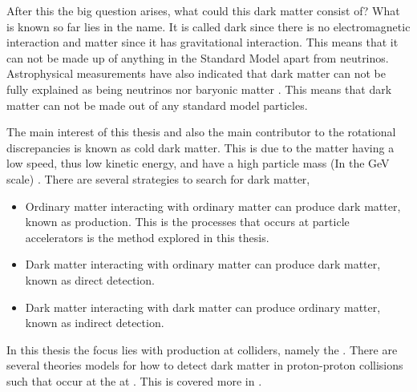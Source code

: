 After this the big question arises, what could this dark matter consist of? What is known so far lies in the name. It is called dark since there is no electromagnetic interaction and matter since it has gravitational interaction. This means that it can not be made up of anything in the Standard Model apart from neutrinos. Astrophysical measurements have also indicated that dark matter can not be fully explained as being neutrinos nor baryonic matter \citep{Gondolo:2003}. This means that dark matter can not be made out of any standard model particles. 

The main interest of this thesis and also the main contributor to the rotational discrepancies is known as cold dark matter. This is due to the matter having a low speed, thus low kinetic energy, and have a high particle mass (In the GeV scale) \citep{Goodman:2010,CERN-PH-EP-2012-210,Jungman:1996}.
There are several strategies to search for dark matter, \citep{Jungman:1996}
\begin{itemize}
\item Ordinary matter interacting with ordinary matter can produce dark matter, known as production. This is the processes that occurs at particle accelerators is the method explored in this thesis.
\item Dark matter interacting with ordinary matter can produce dark matter, known as direct detection.
\item Dark matter interacting with dark matter can produce ordinary matter, known as indirect detection.
\end{itemize} 
In this thesis the focus lies with production at colliders, namely the \abbrLHC . There are several theories models for how to detect dark matter in proton-proton collisions such that occur at the \abbrLHC at \abbrCERN. This is covered more in . 

